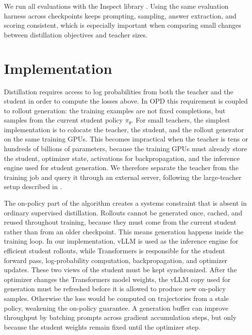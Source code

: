 We run all evaluations with the Inspect library \citep{UK_AI_Security_Institute_Inspect_AI_Framework_2024}. Using the same evaluation harness across checkpoints keeps prompting, sampling, answer extraction, and scoring consistent, which is especially important when comparing small changes between distillation objectives and teacher sizes.

\section{Implementation} \label{sec: implementation}

Distillation requires access to log probabilities from both the teacher and the student in order to compute the losses above. In OPD this requirement is coupled to rollout generation: the training examples are not fixed completions, but samples from the current student policy $\pi_\theta$. For small teachers, the simplest implementation is to colocate the teacher, the student, and the rollout generator on the same training GPUs. This becomes impractical when the teacher is tens or hundreds of billions of parameters, because the training GPUs must already store the student, optimizer state, activations for backpropagation, and the inference engine used for student generation. We therefore separate the teacher from the training job and query it through an external server, following the large-teacher setup described in \citet{patino2026_distilling_100b_models_40x_faster_with_trl}.

The on-policy part of the algorithm creates a systems constraint that is absent in ordinary supervised distillation. Rollouts cannot be generated once, cached, and reused throughout training, because they must come from the current student rather than from an older checkpoint. This means generation happens inside the training loop. In our implementation, vLLM is used as the inference engine for efficient student rollouts, while Transformers \citep{wolf-etal-2020-transformers} is responsible for the student forward pass, log-probability computation, backpropagation, and optimizer updates. These two views of the student must be kept synchronized. After the optimizer changes the Transformers model weights, the vLLM copy used for generation must be refreshed before it is allowed to produce new on-policy samples. Otherwise the loss would be computed on trajectories from a stale policy, weakening the on-policy guarantee. A generation buffer can improve throughput by batching prompts across gradient accumulation steps, but only because the student weights remain fixed until the optimizer step.

